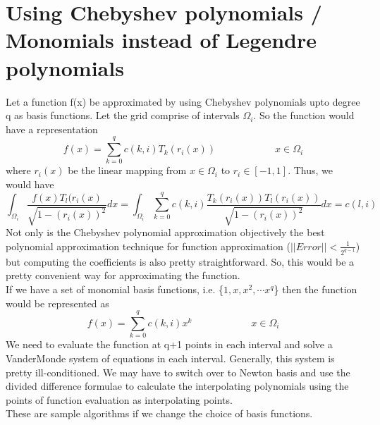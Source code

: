 \documentclass{article}
\author{path1380 }
\date{February 2018}
\begin{document}
\section*{Using Chebyshev polynomials / Monomials instead of Legendre polynomials}
Let a function f(x) be approximated by using Chebyshev polynomials upto degree q as basis functions. Let the grid comprise of intervals $\Omega_{i}$. So the function would have a representation
\begin{equation}
    f(x) = \sum_{k=0}^{q} c(k,i) T_{k}(r_{i}(x)) \hspace{1in} x \in \Omega_{i}
\end{equation}
where $r_{i}(x)$ be the linear mapping from $x \in \Omega_{i}$ to $r_{i} \in [-1,1]$. Thus, we would have
\begin{equation}
    \int_{\Omega_{i}} \frac{f(x) T_{l}(r_{i}(x)}{\sqrt{1 - (r_{i}(x))^{2}}} dx = \int_{\Omega_{i}} \sum_{k=0}^{q} c(k,i) \frac{T_{k}(r_{i}(x)) T_{l}(r_{i}(x))}{\sqrt{1 - (r_{i}(x))^{2}}} dx = c(l,i)
\end{equation}
Not only is the Chebyshev polynomial approximation objectively the best polynomial approximation technique for function approximation ($||Error|| < \frac{1}{2^{q-1}}$) but computing the coefficients is also pretty straightforward. So, this would be a pretty convenient way for approximating the function.\\

If we have a set of monomial basis functions, i.e. \{$1, x, x^{2}, \cdots x^{q}$\} then the function would be represented as 
\begin{equation}
    f(x) =  \sum_{k=0}^{q} c(k,i) x^{k} \hspace{1in} x \in \Omega_{i}
\end{equation}
We need to evaluate the function at q+1 points in each interval and solve a VanderMonde system of equations in each interval. Generally, this system is pretty ill-conditioned. We may have to switch over to Newton basis and use the divided difference formulae to calculate the interpolating polynomials using the points of function evaluation as interpolating points.\\

These are sample algorithms if we change the choice of basis functions.
\end{document}

